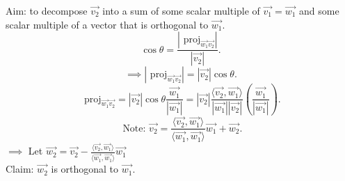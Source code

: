 \documentclass{report}
\begin{document}
     Aim: to decompose $ \vec{ v_2} $ into a sum of some scalar multiple of $ \vec{ v_1} = \vec{ w_1} $ and some scalar multiple of a vector that is orthogonal to $ \vec{ w_1} $.\\
     \[
      \cos \theta = \frac{ \left| \text{ proj}_{ \vec{ w_1} \vec{ v_2} } \right| }{  \left| \vec{ v_2}  \right| }
     .\] 
     \[
      \implies \left| \text{ proj}_{ \vec{ w_1} \vec{ v_2} } \right| =  \left| \vec{ v_2}  \right| \cos \theta 
     .\] 
     \[
      \text{ proj}_{ \vec{ w_1} \vec{ v_2} } = \left| \vec{ v_2}  \right| \cos \theta \frac{ \vec{ w_1} }{ \left| \vec{ w_1}  \right| } = \left| \vec{ v_2}  \right| \frac{ \langle \vec{ v_2} , \vec{ w_1}   \rangle   }{ \left| \vec{ w_1}  \right| \left| \vec{ v_2} \right| }  \left(  \frac{ \vec{ w_1}   }{ \left| \vec{ w_1} \right| } \right) 
     .\] 
     \[
     \text{ Note: } \vec{ v_2} = \frac{ \langle  \vec{ v_2} , \vec{ w_1}   \rangle   }{ \langle  \vec{ w_1} , \vec{ w_1}   \rangle  } \vec{ w_1} + \vec{ w_2} 
     .\] 
     $ \implies$ Let $ \vec{ w_2} = \vec{ v_2} - \frac{  \langle \vec{ v_2} , \vec{ w_1}   \rangle   }{ \langle  \vec{ w_1} , \vec{ w_1}   \rangle  } \vec{ w_1} $ \\
     Claim: $ \vec{ w_2} $ is orthogonal to $ \vec{ w_1} $.\\
\end{document}
